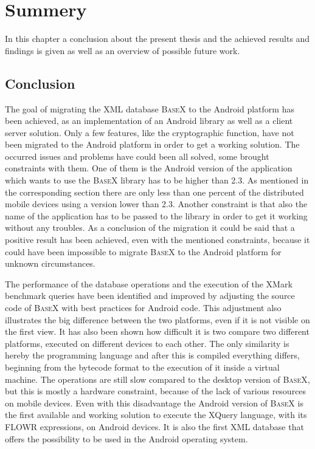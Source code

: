 \chapter{Summery}
\label{cha:summery}
In this chapter a conclusion about the present thesis and the achieved results and findings is given as well as an overview of possible future work.
\section{Conclusion}
\label{sec:summery:conclusion}
The goal of migrating the XML database \textsc{BaseX} to the Android platform has been achieved, as an implementation of an Android library as well as a client server solution.
Only a few features, like the cryptographic function, have not been migrated to the Android platform in order to get a working solution.
The occurred issues and problems have could been all solved, some brought constraints with them.
One of them is the Android version of the application which wants to use the \textsc{BaseX} library has to be higher than 2.3.
As mentioned in the corresponding section there are only less than one percent of the distributed mobile devices using a version lower than 2.3.
Another constraint is that also the name of the application has to be passed to the library in order to get it working without any troubles.
As a conclusion of the migration it could be said that a positive result has been achieved, even with the mentioned constraints, because it could have been impossible to migrate \textsc{BaseX} to the Android platform for unknown circumstances.





The performance of the database operations and the execution of the XMark benchmark queries have been identified and improved by adjusting the source code of \textsc{BaseX} with best practices for Android code.
This adjustment also illustrates the big difference between the two platforms, even if it is not visible on the first view.
It has also been shown how difficult it is two compare two different platforms, executed on different devices to each other.
The only similarity is hereby the programming language and after this is compiled everything differs, beginning from the bytecode format to the execution of it inside a virtual machine.
The operations are still slow compared to the desktop version of \textsc{BaseX}, but this is mostly a hardware constraint, because of the lack of various resources on mobile devices.
Even with this disadvantage the Android version of \textsc{BaseX} is the first available and working solution to execute the XQuery language, with its FLOWR expressions, on Android devices.
It is also the first XML database that offers the possibility to be used in the Android operating system.




